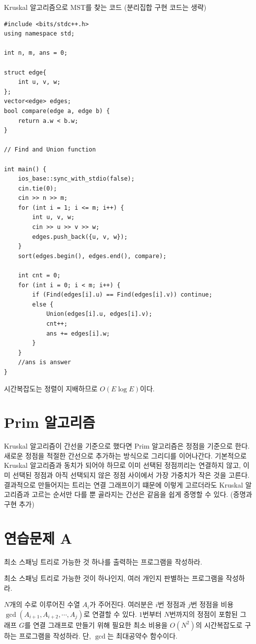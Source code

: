 \begin{code} \label{code: Kruskal}
Kruskal 알고리즘으로 MST를 찾는 코드 (분리집합 구현 코드는 생략)
\begin{lstlisting}
#include <bits/stdc++.h>
using namespace std;

int n, m, ans = 0;

struct edge{
    int u, v, w;
};
vector<edge> edges;
bool compare(edge a, edge b) {
    return a.w < b.w;
}

// Find and Union function

int main() {
    ios_base::sync_with_stdio(false);
    cin.tie(0);
    cin >> n >> m;
    for (int i = 1; i <= m; i++) {
        int u, v, w;
        cin >> u >> v >> w;
        edges.push_back({u, v, w});
    }
    sort(edges.begin(), edges.end(), compare);

    int cnt = 0;
    for (int i = 0; i < m; i++) {
        if (Find(edges[i].u) == Find(edges[i].v)) continue;
        else {
            Union(edges[i].u, edges[i].v);
            cnt++;
            ans += edges[i].w;
        }
    }
    //ans is answer
}
\end{lstlisting}
\end{code}

시간복잡도는 정렬이 지배하므로 $O(E \log E)$이다.

\section{Prim 알고리즘}
Kruskal 알고리즘이 간선을 기준으로 했다면 Prim 알고리즘은 정점을 기준으로 한다. 새로운 정점을 적절한 간선으로 추가하는 방식으로 그리디를 이어나간다.
기본적으로 Kruskal 알고리즘과 동치가 되어야 하므로 이미 선택된 정점끼리는 연결하지 않고, 이미 선택된 정점과 아직 선택되지 않은 정점 사이에서 가장 가중치가 작은 것을 고른다. 결과적으로 만들어지는 트리는 연결 그래프이기 떄문에 이렇게 고르더라도 Kruskal 알고리즘과 고르는 순서만 다를 뿐 골라지는 간선은 같음을 쉽게 증명할 수 있다.
(증명과 구현 추가)

\section{연습문제 A}
\begin{problem}
    최소 스패닝 트리로 가능한 것 하나를 출력하는 프로그램을 작성하라.
\end{problem}
\begin{problem}
    최소 스패닝 트리로 가능한 것이 하나인지, 여러 개인지 판별하는 프로그램을 작성하라.
\end{problem}
\begin{problem}
    $N$개의 수로 이루어진 수열 $A_i$가 주어진다. 여러분은 $i$번 정점과 $j$번 정점을 비용 $\gcd(A_{i+1}, A_{i+2}, \cdots, A_j)$로 연결할 수 있다. $1$번부터 $N$번까지의 정점이 포함된 그래프 $G$를 연결 그래프로 만들기 위해 필요한 최소 비용을 $O(N^2)$의 시간복잡도로 구하는 프로그램을 작성하라. 단, $\gcd$는 최대공약수 함수이다.
\end{problem}

